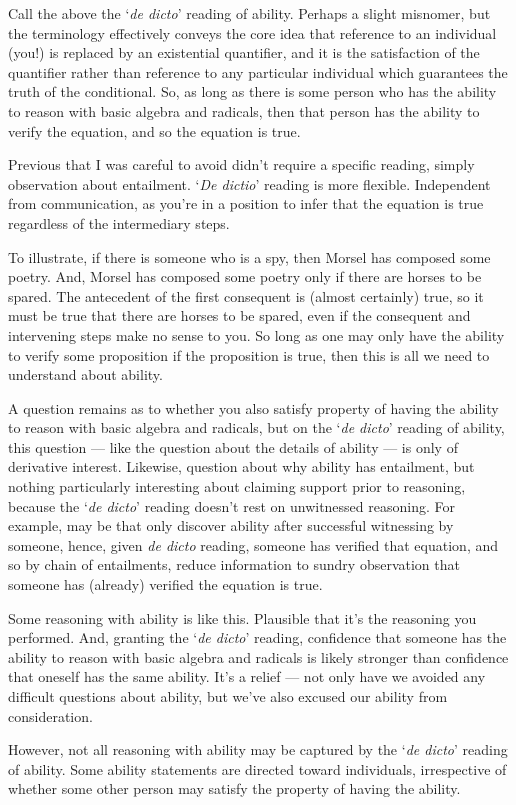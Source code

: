 \begin{note}
  Call the above the `\emph{de dicto}' reading of ability.
  Perhaps a slight misnomer, but the terminology effectively conveys the core idea that reference to an individual (you!) is replaced by an existential quantifier, and it is the satisfaction of the quantifier rather than reference to any particular individual which guarantees the truth of the conditional.
  So, as long as there is some person who has the ability to reason with basic algebra and radicals, then that person has the ability to verify the equation, and so the equation is true.

  Previous that I was careful to avoid didn't require a specific reading, simply observation about entailment.
  `\emph{De dictio}' reading is more flexible.
  Independent from communication, as you're in a position to infer that the equation is true regardless of the intermediary steps.

  To illustrate, if there is someone who is a spy, then Morsel has composed some poetry.
  And, Morsel has composed some poetry only if there are horses to be spared.
  The antecedent of the first consequent is (almost certainly) true, so it must be true that there are horses to be spared, even if the consequent and intervening steps make no sense to you.
  So long as one may only have the ability to verify some proposition if the proposition is true, then this is all we need to understand about ability.

  A question remains as to whether you also satisfy property of having the ability to reason with basic algebra and radicals, but on the `\emph{de dicto}' reading of ability, this question --- like the question about the details of ability --- is only of derivative interest.
  Likewise, question about why ability has entailment, but nothing particularly interesting about claiming support prior to reasoning, because the `\emph{de dicto}' reading doesn't rest on unwitnessed reasoning.
  For example, may be that only discover ability after successful witnessing by someone, hence, given \emph{de dicto} reading, someone has verified that equation, and so by chain of entailments, reduce information to sundry observation that someone has (already) verified the equation is true.

  Some reasoning with ability is like this.
  Plausible that it's the reasoning you performed.
  And, granting the `\emph{de dicto}' reading, confidence that someone has the ability to reason with basic algebra and radicals is likely stronger than confidence that oneself has the same ability.
  It's a relief --- not only have we avoided any difficult questions about ability, but we've also excused our ability from consideration.

  However, not all reasoning with ability may be captured by the `\emph{de dicto}' reading of ability.
  Some ability statements are directed toward individuals, irrespective of whether some other person may satisfy the property of having the ability.
\end{note}

